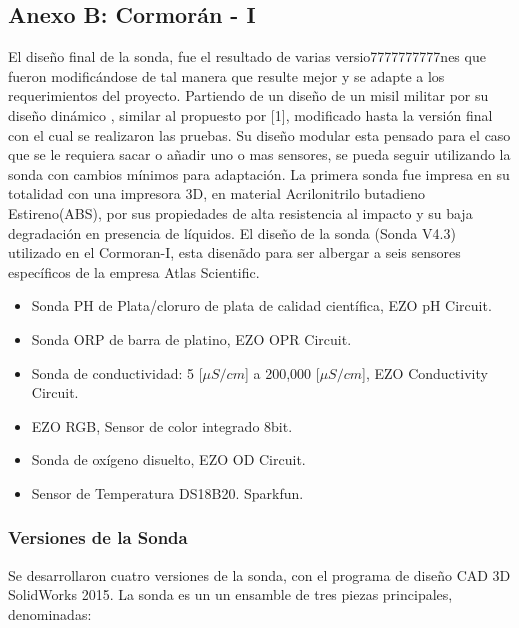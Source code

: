 \begin{appendices}
\chapter*{Anexo B: Cormor\'an - I}
\label{Anexo:Cormoran}
El diseño final de la sonda, fue el resultado de varias versio7777777777nes que fueron modificándose de tal manera que resulte mejor y se adapte a los requerimientos del proyecto.
Partiendo de un diseño de un misil militar por su dise\~no din\'amico , similar al propuesto por [1], modificado hasta la versión final con el cual se realizaron las pruebas. Su diseño modular esta pensado para el caso que se le requiera sacar o añadir uno o mas sensores, se pueda seguir utilizando la sonda con cambios mínimos para adaptación.
La primera sonda fue impresa en su totalidad con una impresora 3D, en material Acrilonitrilo butadieno Estireno(ABS), por sus propiedades de alta resistencia al impacto y su baja degradación en presencia de líquidos. 
El diseño de la sonda (Sonda V4.3) utilizado en el Cormoran-I, esta disen\~ado para ser albergar a seis sensores específicos de la empresa Atlas Scientific.

\begin{itemize}
    \item Sonda PH de Plata/cloruro de plata de calidad científica, EZO pH Circuit.
    \item Sonda ORP de barra de platino, EZO OPR Circuit.
    \item Sonda de conductividad: 5 [\(\mu S/cm\)] a 200,000 [\(\mu S/cm\)], EZO Conductivity Circuit.
    \item EZO RGB, Sensor de color integrado 8bit.
    \item Sonda de oxígeno disuelto, EZO OD Circuit.
    \item Sensor de Temperatura DS18B20. Sparkfun.
\end{itemize}
    
\subsection{Versiones de la Sonda }
Se desarrollaron cuatro versiones de la sonda, con el programa de diseño CAD 3D SolidWorks 2015. La sonda es un un ensamble de tres piezas principales, denominadas:


\end{appendices}
